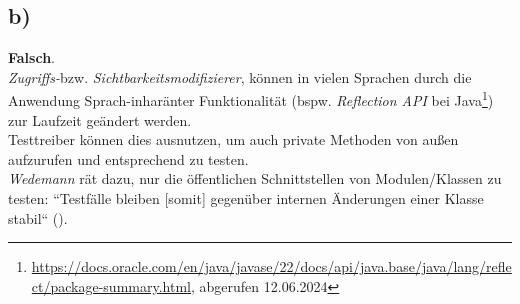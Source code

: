 \subsection*{b)}



\textbf{Falsch}.\\
\textit{Zugriffs-}bzw. \textit{Sichtbarkeitsmodifizierer}, können in vielen Sprachen durch die Anwendung Sprach-inharänter Funktionalität (bspw. \textit{Reflection API} bei Java\footnote{
\url{https://docs.oracle.com/en/java/javase/22/docs/api/java.base/java/lang/reflect/package-summary.html}, abgerufen 12.06.2024
}) zur Laufzeit geändert werden.\\
Testtreiber können dies ausnutzen, um auch private Methoden von außen aufzurufen und entsprechend zu testen.\\

\noindent
\textit{Wedemann} rät dazu, nur die öffentlichen Schnittstellen von Modulen/Klassen zu testen: ``Testfälle bleiben [somit] gegenüber internen Änderungen einer Klasse stabil`` (\cite[56]{Wed09}).

